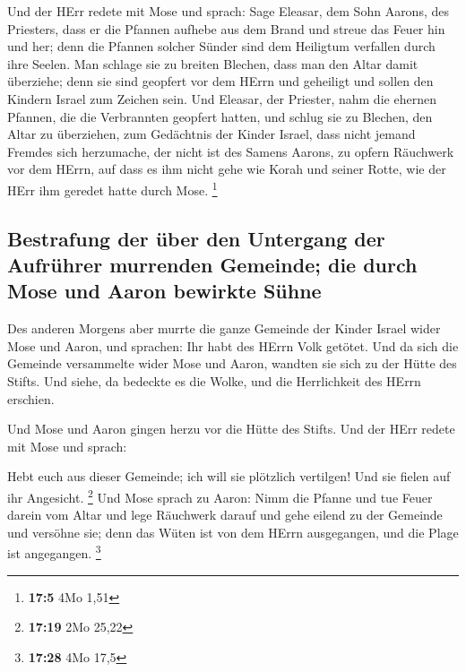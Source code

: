  Und der HErr redete mit Mose und sprach: 
Sage Eleasar, dem Sohn Aarons, des Priesters, dass er die Pfannen
aufhebe aus dem Brand und streue das Feuer hin und her; 
denn die Pfannen solcher Sünder sind dem Heiligtum verfallen durch ihre
Seelen. Man schlage sie zu breiten Blechen, dass man den Altar damit
überziehe; denn sie sind geopfert vor dem HErrn und geheiligt und sollen
den Kindern Israel zum Zeichen sein.  Und Eleasar, der
Priester, nahm die ehernen Pfannen, die die Verbrannten geopfert hatten,
und schlug sie zu Blechen, den Altar zu überziehen,  zum
Gedächtnis der Kinder Israel, dass nicht jemand Fremdes sich herzumache,
der nicht ist des Samens Aarons, zu opfern Räuchwerk vor dem HErrn, auf
dass es ihm nicht gehe wie Korah und seiner Rotte, wie der HErr ihm
geredet hatte durch Mose. \footnote{\textbf{17:5} 4Mo 1,51}

\hypertarget{bestrafung-der-uxfcber-den-untergang-der-aufruxfchrer-murrenden-gemeinde-die-durch-mose-und-aaron-bewirkte-suxfchne}{%
\subsection{Bestrafung der über den Untergang der Aufrührer murrenden
Gemeinde; die durch Mose und Aaron bewirkte
Sühne}\label{bestrafung-der-uxfcber-den-untergang-der-aufruxfchrer-murrenden-gemeinde-die-durch-mose-und-aaron-bewirkte-suxfchne}}

 Des anderen Morgens aber murrte die ganze Gemeinde der
Kinder Israel wider Mose und Aaron, und sprachen: Ihr habt des HErrn
Volk getötet.  Und da sich die Gemeinde versammelte wider
Mose und Aaron, wandten sie sich zu der Hütte des Stifts. Und siehe, da
bedeckte es die Wolke, und die Herrlichkeit des HErrn erschien.

 Und Mose und Aaron gingen herzu vor die Hütte des Stifts.
 Und der HErr redete mit Mose und sprach:

 Hebt euch aus dieser Gemeinde; ich will sie plötzlich
vertilgen! Und sie fielen auf ihr Angesicht. \footnote{\textbf{17:19}
  2Mo 25,22}  Und Mose sprach zu Aaron: Nimm die Pfanne
und tue Feuer darein vom Altar und lege Räuchwerk darauf und gehe eilend
zu der Gemeinde und versöhne sie; denn das Wüten ist von dem HErrn
ausgegangen, und die Plage ist angegangen. \footnote{\textbf{17:28} 4Mo
  17,5}

